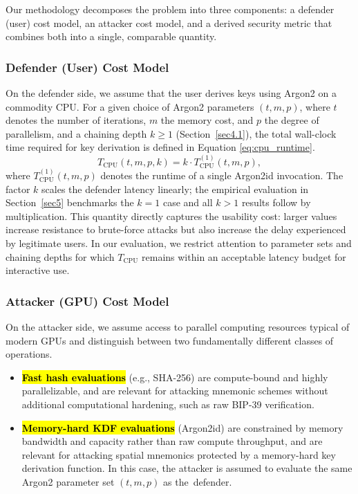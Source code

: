 \documentclass[mathematics,article,accept,pdftex,moreauthors]{Definitions/mdpi}
\begin{document}
Our methodology decomposes the problem into three components: a defender (user) cost model, an attacker cost model, and a derived security metric that combines both into a single, comparable quantity.

\subsubsection{Defender (User) Cost Model}

On the defender side, we assume that the user derives keys using Argon2 on a commodity CPU. For a given choice of Argon2 parameters $(t, m, p)$, where $t$ denotes the number of iterations, $m$ the memory cost, and $p$ the degree of parallelism, and a chaining depth $k \geq 1$ (Section~\ref{sec4.1}), the total wall-clock time required for key derivation is defined in Equation \eqref{eq:cpu_runtime}.
\begin{equation}
T_{\text{CPU}}(t, m, p, k) = k \cdot T_{\text{CPU}}^{(1)}(t, m, p),
\label{eq:cpu_runtime}
\end{equation}
where $T_{\text{CPU}}^{(1)}(t, m, p)$ denotes the runtime of a single Argon2id invocation. {The factor $k$ scales the defender latency linearly; the empirical evaluation in Section~\ref{sec5} benchmarks the $k=1$ case and all $k > 1$ results follow by multiplication.} This quantity directly captures the usability cost: larger values increase resistance to brute-force attacks but also increase the delay experienced by legitimate users. In our evaluation, we restrict attention to parameter sets and chaining depths for which $T_{\text{CPU}}$ remains within an acceptable latency budget for interactive use.

\subsubsection{Attacker (GPU) Cost Model}

On the attacker side, we assume access to parallel computing resources typical of modern GPUs and distinguish between two fundamentally different classes of operations.
\begin{itemize}
\item \textbf{\hl{Fast hash evaluations}} (e.g., SHA-256) are compute-bound and highly parallelizable, and are relevant for attacking mnemonic schemes without additional computational hardening, such as raw BIP-39 verification.
\item \textbf{\hl{Memory-hard KDF evaluations}} (Argon2id) are constrained by memory bandwidth and capacity rather than raw compute throughput, and are relevant for attacking spatial mnemonics protected by a memory-hard key derivation function. In this case, the attacker is assumed to evaluate the same Argon2 parameter set $(t, m, p)$ as \mbox{the defender.}
\end{itemize}
\end{document}

